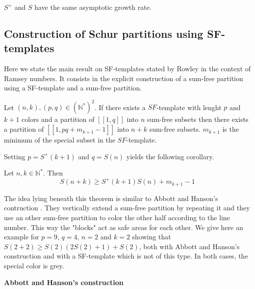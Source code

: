 \begin{remark}
	\(S^+\) and \(S\) have the same asymptotic growth rate.
\end{remark}


\subsection{Construction of Schur partitions using SF-templates}

\qquad Here we state the main result on SF-templates stated by Rowley in the context of Ramsey numbers. It consists 
in the explicit construction of a sum-free partition using a SF-template and a sum-free partition.

\begin{theorem}
	Let \((n,k), (p,q) \in (\mathbb{N}^*)^2\). If there exists a \(SF\)-template with lenght \(p\) and \(k+1\) colors 
	and a partition of \([\![1,q]\!]\) into \(n\) sum-free subsets then there exists a partition of \([\![1,pq+m_{k+1}
	-1]\!]\) into \(n+k\) sum-free subsets. \(m_{k+1}\) is the minimum of the special subset in the \(SF\)-template.
\end{theorem}

Setting \(p = S^+(k+1)\) and \(q = S(n)\) yields the following corollary.

\begin{corollary}
	Let \(n, k \in \mathbb{N}^*\). Then
	\[ S(n+k) \geqslant S^+(k+1)S(n) + m_{k+1} - 1 \]
\end{corollary}

The idea lying beneath this theorem is similar to Abbott and Hanson's contruction \cite{AbbottHanson}. They vertically 
extend a sum-free partition by repeating it and they use an other sum-free partition to color the other half according 
to the line number. This way the "blocks" act as safe areas for each other. We give here an example for \(p = 9\), 
\(q = 4\), \(n = 2\) and \(k = 2\) showing that \(S(2 + 2) \geqslant S(2) (2 S(2) + 1) + S(2)\), both with Abbott 
and Hanson's construction and with a SF-template which is not of this type. In both cases, the special color is grey.

\begin{center}
\textbf{Abbott and Hanson's construction}
\end{center}

